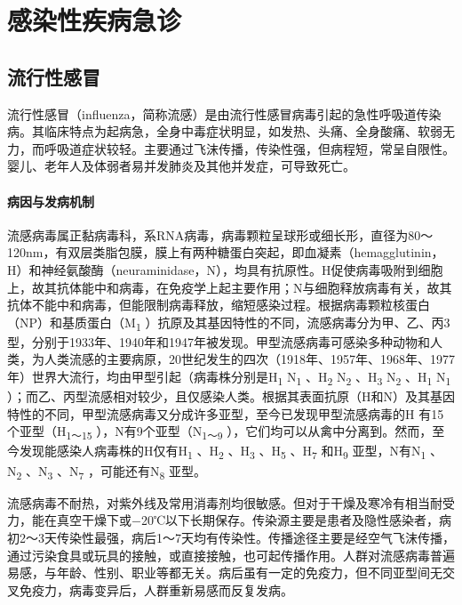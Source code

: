 \part{感染性疾病急诊}

\chapter{流行性感冒}

流行性感冒（influenza，简称流感）是由流行性感冒病毒引起的急性呼吸道传染病。其临床特点为起病急，全身中毒症状明显，如发热、头痛、全身酸痛、软弱无力，而呼吸道症状较轻。主要通过飞沫传播，传染性强，但病程短，常呈自限性。婴儿、老年人及体弱者易并发肺炎及其他并发症，可导致死亡。

\subsection{病因与发病机制}

流感病毒属正黏病毒科，系RNA病毒，病毒颗粒呈球形或细长形，直径为80～120nm，有双层类脂包膜，膜上有两种糖蛋白突起，即血凝素（hemagglutinin，H）和神经氨酸酶（neuraminidase，N），均具有抗原性。H促使病毒吸附到细胞上，故其抗体能中和病毒，在免疫学上起主要作用；N与细胞释放病毒有关，故其抗体不能中和病毒，但能限制病毒释放，缩短感染过程。根据病毒颗粒核蛋白（NP）和基质蛋白（M\textsubscript{1}
）抗原及其基因特性的不同，流感病毒分为甲、乙、丙3型，分别于1933年、1940年和1947年被发现。甲型流感病毒可感染多种动物和人类，为人类流感的主要病原，20世纪发生的四次（1918年、1957年、1968年、1977年）世界大流行，均由甲型引起（病毒株分别是H\textsubscript{1}
N\textsubscript{1} 、H\textsubscript{2} N\textsubscript{2}
、H\textsubscript{3} N\textsubscript{2} 、H\textsubscript{1}
N\textsubscript{1}
）；而乙、丙型流感相对较少，且仅感染人类。根据其表面抗原（H和N）及其基因特性的不同，甲型流感病毒又分成许多亚型，至今已发现甲型流感病毒的H
有15个亚型（H\textsubscript{1～15} ），N有9个亚型（N\textsubscript{1～9}
），它们均可以从禽中分离到。然而，至今发现能感染人病毒株的H仅有H\textsubscript{1}
、H\textsubscript{2} 、H\textsubscript{3} 、H\textsubscript{5}
、H\textsubscript{7} 和H\textsubscript{9} 亚型，N有N\textsubscript{1}
、N\textsubscript{2} 、N\textsubscript{3} 、N\textsubscript{7}
，可能还有N\textsubscript{8} 亚型。

流感病毒不耐热，对紫外线及常用消毒剂均很敏感。但对于干燥及寒冷有相当耐受力，能在真空干燥下或−20℃以下长期保存。传染源主要是患者及隐性感染者，病初2～3天传染性最强，病后1～7天均有传染性。传播途径主要是经空气飞沫传播，通过污染食具或玩具的接触，或直接接触，也可起传播作用。人群对流感病毒普遍易感，与年龄、性别、职业等都无关。病后虽有一定的免疫力，但不同亚型间无交叉免疫力，病毒变异后，人群重新易感而反复发病。

